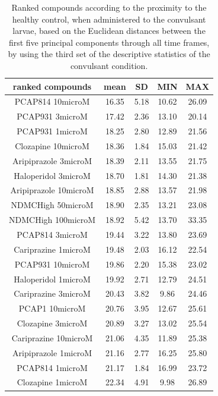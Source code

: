 \documentclass[a4paper,12pt]{article}
\begin{document}
\newpage
\begin{table}[h!]\tiny
\centering
\caption{Ranked compounds according to the proximity to the healthy control, when administered to the convulsant larvae, based on the Euclidean distances between the first five principal components through all time frames, by using the third set of the descriptive statistics of the convulsant condition.}
\begin{tabular}{|c|c|c|c|c|}
\hline
ranked compounds             & mean & SD   & MIN  & MAX   \\ \hline
PCAP814 10microM      & 16.35 & 5.18 & 10.62 & 26.09 \\ \hline
PCAP931 3microM       & 17.42 & 2.36 & 13.10  & 20.14 \\ \hline
PCAP931 1microM       & 18.25 & 2.80  & 12.89 & 21.56 \\ \hline
Clozapine 10microM    & 18.36 & 1.84 & 15.03 & 21.42 \\ \hline
Aripiprazole 3microM  & 18.39 & 2.11 & 13.55 & 21.75 \\ \hline
Haloperidol 3microM   & 18.70  & 1.81 & 14.30  & 21.38 \\ \hline
Aripiprazole 10microM & 18.85 & 2.88 & 13.57 & 21.98 \\ \hline
NDMCHigh 50microM     & 18.90  & 2.35 & 13.21 & 23.08 \\ \hline
NDMCHigh 100microM    & 18.92 & 5.42 & 13.70  & 33.35 \\ \hline
PCAP814 3microM       & 19.44 & 3.22 & 13.80  & 23.69 \\ \hline
Cariprazine 1microM   & 19.48 & 2.03 & 16.12 & 22.54 \\ \hline
PCAP931 10microM      & 19.86 & 2.20  & 15.38 & 23.02 \\ \hline
Haloperidol 1microM   & 19.92 & 2.71 & 12.79 & 24.51 \\ \hline
Cariprazine 3microM   & 20.43 & 3.82 & 9.86  & 24.46 \\ \hline
PCAP1 10microM        & 20.76 & 3.95 & 12.67 & 25.61 \\ \hline
Clozapine 3microM     & 20.89 & 3.27 & 13.02 & 25.54 \\ \hline
Cariprazine 10microM  & 21.06 & 4.35 & 11.89 & 25.38 \\ \hline
Aripiprazole 1microM  & 21.16 & 2.77 & 16.25 & 25.80  \\ \hline
PCAP814 1microM       & 21.17 & 1.84 & 16.99 & 23.72 \\ \hline
Clozapine 1microM     & 22.34 & 4.91 & 9.98  & 26.89 \\ \hline

\end{tabular}
\end{table}
\end{document}
